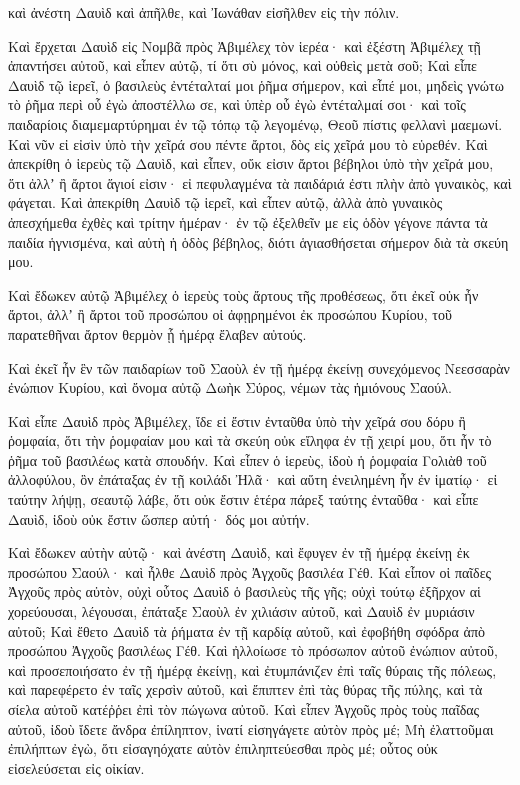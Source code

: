 {καὶ ἀνέστη Δαυὶδ καὶ ἀπῆλθε, καὶ Ἰωνάθαν εἰσῆλθεν εἰς τὴν πόλιν.
\par }{\PP {}Καὶ ἔρχεται Δαυὶδ εἰς Νομβᾶ πρὸς Ἀβιμέλεχ τὸν ἱερέα· καὶ ἐξέστη Ἀβιμέλεχ τῇ ἀπαντήσει αὐτοῦ, καὶ εἶπεν αὐτῷ, τί ὅτι σὺ μόνος, καὶ οὐθεὶς μετὰ σοῦ;
Καὶ εἶπε Δαυὶδ τῷ ἱερεῖ, ὁ βασιλεὺς ἐντέταλταί μοι ῥῆμα σήμερον, καὶ εἶπέ μοι, μηδεὶς γνώτω τὸ ῥῆμα περὶ οὗ ἐγὼ ἀποστέλλω σε, καὶ ὑπὲρ οὗ ἐγὼ ἐντέταλμαί σοι· καὶ τοῖς παιδαρίοις διαμεμαρτύρημαι ἐν τῷ τόπῳ τῷ λεγομένῳ, Θεοῦ πίστις φελλανὶ μαεμωνί.
Καὶ νῦν εἰ εἰσὶν ὑπὸ τὴν χεῖρά σου πέντε ἄρτοι, δὸς εἰς χεῖρά μου τὸ εὑρεθέν.
Καὶ ἀπεκρίθη ὁ ἱερεὺς τῷ Δαυὶδ, καὶ εἶπεν, οὔκ εἰσιν ἄρτοι βέβηλοι ὑπὸ τὴν χεῖρά μου, ὅτι ἀλλʼ ἢ ἄρτοι ἅγιοί εἰσιν· εἰ πεφυλαγμένα τὰ παιδάριά ἐστι πλὴν ἀπὸ γυναικὸς, καὶ φάγεται.
Καὶ ἀπεκρίθη Δαυὶδ τῷ ἱερεῖ, καὶ εἶπεν αὐτῷ, ἀλλὰ ἀπὸ γυναικὸς ἀπεσχήμεθα ἐχθὲς καὶ τρίτην ἡμέραν· ἐν τῷ ἐξελθεῖν με εἰς ὁδὸν γέγονε πάντα τὰ παιδία ἡγνισμένα, καὶ αὐτὴ ἡ ὁδὸς βέβηλος, διότι ἁγιασθήσεται σήμερον διὰ τὰ σκεύη μου.
\par }{\PP {}Καὶ ἔδωκεν αὐτῷ Ἀβιμέλεχ ὁ ἱερεὺς τοὺς ἄρτους τῆς προθέσεως, ὅτι ἐκεῖ οὐκ ἦν ἄρτοι, ἀλλʼ ἢ ἄρτοι τοῦ προσώπου οἱ ἀφῃρημένοι ἐκ προσώπου Κυρίου, τοῦ παρατεθῆναι ἄρτον θερμὸν ᾗ ἡμέρᾳ ἔλαβεν αὐτούς.
\par }{\PP {}Καὶ ἐκεῖ ἦν ἓν τῶν παιδαρίων τοῦ Σαοὺλ ἐν τῇ ἡμέρᾳ ἐκείνῃ συνεχόμενος Νεεσσαρὰν ἐνώπιον Κυρίου, καὶ ὄνομα αὐτῷ Δωὴκ Σύρος, νέμων τὰς ἡμιόνους Σαούλ.
\par }{\PP {}Καὶ εἶπε Δαυὶδ πρὸς Ἀβιμέλεχ, ἴδε εἰ ἔστιν ἐνταῦθα ὑπὸ τὴν χεῖρά σου δόρυ ἢ ῥομφαία, ὅτι τὴν ῥομφαίαν μου καὶ τὰ σκεύη οὐκ εἴληφα ἐν τῇ χειρί μου, ὅτι ἦν τὸ ῥῆμα τοῦ βασιλέως κατὰ σπουδήν.
Καὶ εἶπεν ὁ ἱερεὺς, ἰδοὺ ἡ ῥομφαία Γολιὰθ τοῦ ἀλλοφύλου, ὃν ἐπάταξας ἐν τῇ κοιλάδι Ἠλᾶ· καὶ αὕτη ἐνειλημένη ἦν ἐν ἱματίῳ· εἰ ταύτην λήψῃ, σεαυτῷ λάβε, ὅτι οὐκ ἔστιν ἑτέρα πάρεξ ταύτης ἐνταῦθα· καὶ εἶπε Δαυὶδ, ἰδοὺ οὐκ ἔστιν ὥσπερ αὐτή· δός μοι αὐτήν.
\par }{\PP {}Καὶ ἔδωκεν αὐτὴν αὐτῷ· καὶ ἀνέστη Δαυὶδ, καὶ ἔφυγεν ἐν τῇ ἡμέρᾳ ἐκείνῃ ἐκ προσώπου Σαούλ· καὶ ἦλθε Δαυὶδ πρὸς Ἀγχοῦς βασιλέα Γέθ.
Καὶ εἶπον οἱ παῖδες Ἀγχοῦς πρὸς αὐτὸν, οὐχὶ οὗτος Δαυὶδ ὁ βασιλεὺς τῆς γῆς; οὐχὶ τούτῳ ἐξῆρχον αἱ χορεύουσαι, λέγουσαι, ἐπάταξε Σαοὺλ ἐν χιλιάσιν αὐτοῦ, καὶ Δαυὶδ ἐν μυριάσιν αὐτοῦ;
Καὶ ἔθετο Δαυὶδ τὰ ῥήματα ἐν τῇ καρδίᾳ αὐτοῦ, καὶ ἐφοβήθη σφόδρα ἀπὸ προσώπου Ἀγχοῦς βασιλέως Γέθ.
Καὶ ἠλλοίωσε τὸ πρόσωπον αὐτοῦ ἐνώπιον αὐτοῦ, καὶ προσεποιήσατο ἐν τῇ ἡμέρᾳ ἐκείνῃ, καὶ ἐτυμπάνιζεν ἐπὶ ταῖς θύραις τῆς πόλεως, καὶ παρεφέρετο ἐν ταῖς χερσὶν αὐτοῦ, καὶ ἔπιπτεν ἐπὶ τὰς θύρας τῆς πύλης, καὶ τὰ σίελα αὐτοῦ κατέῤῥει ἐπὶ τὸν πώγωνα αὐτοῦ.
Καὶ εἶπεν Ἀγχοῦς πρὸς τοὺς παῖδας αὐτοῦ, ἰδοὺ ἴδετε ἄνδρα ἐπίληπτον, ἱνατί εἰσηγάγετε αὐτὸν πρὸς μέ;
Μὴ ἐλαττοῦμαι ἐπιλήπτων ἐγὼ, ὅτι εἰσαγηόχατε αὐτὸν ἐπιληπτεύεσθαι πρὸς μέ; οὗτος οὐκ εἰσελεύσεται εἰς οἰκίαν.

}
